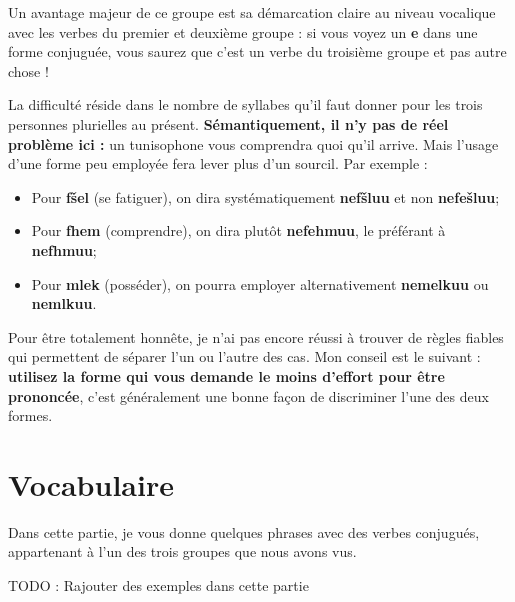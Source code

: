 Un avantage majeur de ce groupe est sa démarcation claire au niveau vocalique avec les verbes du premier et deuxième groupe : si vous voyez un \textbf{e} dans une forme conjuguée, vous saurez que c'est un verbe du troisième groupe et pas autre chose ! 

La difficulté réside dans le nombre de syllabes qu'il faut donner pour les trois personnes plurielles au présent. \textbf{Sémantiquement, il n'y pas de réel problème ici :} un tunisophone vous comprendra quoi qu'il arrive. Mais l'usage d'une forme peu employée fera lever plus d'un sourcil. Par exemple :
 \begin{itemize}
     \item Pour \textbf{f\v{s}el} (se fatiguer), on dira systématiquement \textbf{nef\v{s}luu} et non \textbf{nefe\v{s}luu};
     \item Pour \textbf{fhem} (comprendre), on dira plutôt \textbf{nefehmuu}, le préférant à \textbf{nefhmuu};
     \item Pour \textbf{mlek} (posséder), on pourra employer alternativement \textbf{nemelkuu} ou \textbf{nemlkuu}.
 \end{itemize}

Pour être totalement honnête, je n'ai pas encore réussi à trouver de règles fiables qui permettent de séparer l'un ou l'autre des cas. Mon conseil est le suivant : \textbf{utilisez la forme qui vous demande le moins d'effort pour être prononcée}, c'est généralement une bonne façon de discriminer l'une des deux formes.

\section*{Vocabulaire}
Dans cette partie, je vous donne quelques phrases avec des verbes conjugués, appartenant à l'un des trois groupes que nous avons vus. 

TODO : Rajouter des exemples dans cette partie 
